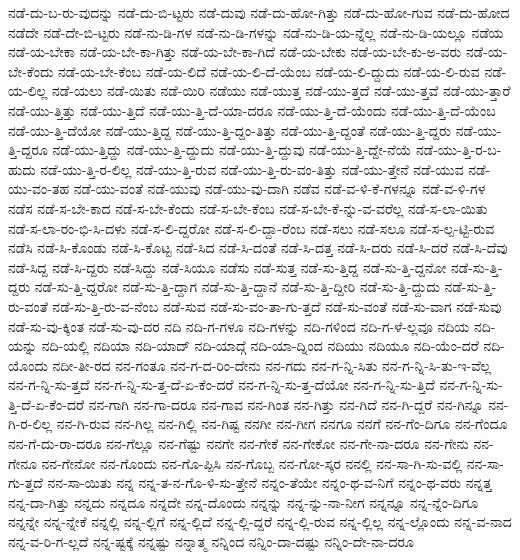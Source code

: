 {ನಡೆ-ದು-ಬ-ರು-ವುದನ್ನು
ನಡೆ-ದು-ಬಿ-ಟ್ಟರು
ನಡೆ-ದುವು
ನಡೆ-ದು-ಹೋ-ಗಿತ್ತು
ನಡೆ-ದು-ಹೋ-ಗುವ
ನಡೆ-ದು-ಹೋದ
ನಡೆದೇ
ನಡೆ-ದೇ-ಬಿ-ಟ್ಟರು
ನಡೆ-ನು-ಡಿ-ಗಳ
ನಡೆ-ನು-ಡಿ-ಗಳನ್ನು
ನಡೆ-ನು-ಡಿ-ಯ-ನ್ನೆಲ್ಲ
ನಡೆ-ನು-ಡಿ-ಯಲ್ಲೂ
ನಡೆಯ
ನಡೆ-ಯ-ಬೇಕಾ
ನಡೆ-ಯ-ಬೇ-ಕಾ-ಗಿತ್ತು
ನಡೆ-ಯ-ಬೇ-ಕಾ-ಗಿದೆ
ನಡೆ-ಯ-ಬೇಕು
ನಡೆ-ಯ-ಬೇ-ಕು-ಅ-ವರು
ನಡೆ-ಯ-ಬೇ-ಕೆಂದು
ನಡೆ-ಯ-ಬೇ-ಕೆಂಬ
ನಡೆ-ಯ-ಲಿದೆ
ನಡೆ-ಯ-ಲಿ-ದೆ-ಯೆಂಬ
ನಡೆ-ಯ-ಲಿ-ದ್ದುದು
ನಡೆ-ಯ-ಲಿ-ರುವ
ನಡೆ-ಯ-ಲಿಲ್ಲ
ನಡೆ-ಯಲು
ನಡೆ-ಯಿತು
ನಡೆ-ಯಿರಿ
ನಡೆಯು
ನಡೆ-ಯುತ್ತ
ನಡೆ-ಯು-ತ್ತದೆ
ನಡೆ-ಯು-ತ್ತವೆ
ನಡೆ-ಯು-ತ್ತಾರೆ
ನಡೆ-ಯು-ತ್ತಿತ್ತು
ನಡೆ-ಯು-ತ್ತಿದೆ
ನಡೆ-ಯು-ತ್ತಿ-ದೆ-ಯಾ-ದರೂ
ನಡೆ-ಯು-ತ್ತಿ-ದೆ-ಯೆಂದು
ನಡೆ-ಯು-ತ್ತಿ-ದೆ-ಯೆಂಬ
ನಡೆ-ಯು-ತ್ತಿ-ದೆಯೋ
ನಡೆ-ಯು-ತ್ತಿದ್ದ
ನಡೆ-ಯು-ತ್ತಿ-ದ್ದಂ-ತಿತ್ತು
ನಡೆ-ಯು-ತ್ತಿ-ದ್ದಂತೆ
ನಡೆ-ಯು-ತ್ತಿ-ದ್ದರು
ನಡೆ-ಯು-ತ್ತಿ-ದ್ದರೂ
ನಡೆ-ಯು-ತ್ತಿದ್ದು
ನಡೆ-ಯು-ತ್ತಿ-ದ್ದುದು
ನಡೆ-ಯು-ತ್ತಿ-ದ್ದುವು
ನಡೆ-ಯು-ತ್ತಿ-ದ್ದೇ-ನೆಯೆ
ನಡೆ-ಯು-ತ್ತಿ-ರ-ಬ-ಹುದು
ನಡೆ-ಯು-ತ್ತಿ-ರ-ಲಿಲ್ಲ
ನಡೆ-ಯು-ತ್ತಿ-ರುವ
ನಡೆ-ಯು-ತ್ತಿ-ರು-ವಂ-ತಿತ್ತು
ನಡೆ-ಯು-ತ್ತೇನೆ
ನಡೆ-ಯುವ
ನಡೆ-ಯು-ವಂ-ತಹ
ನಡೆ-ಯು-ವಂತೆ
ನಡೆ-ಯುವು
ನಡೆ-ಯು-ವು-ದಾಗಿ
ನಡೆವ
ನಡೆ-ವ-ಳಿ-ಕೆ-ಗಳನ್ನೂ
ನಡೆ-ವ-ಳಿ-ಗಳ
ನಡೆಸ
ನಡೆ-ಸ-ಬೇ-ಕಾದ
ನಡೆ-ಸ-ಬೇ-ಕೆಂದು
ನಡೆ-ಸ-ಬೇ-ಕೆಂಬ
ನಡೆ-ಸ-ಬೇ-ಕೆ-ನ್ನು-ವ-ವರೆಲ್ಲ
ನಡೆ-ಸ-ಲಾ-ಯಿತು
ನಡೆ-ಸ-ಲಾ-ರಂ-ಭಿ-ಸಿ-ದಳು
ನಡೆ-ಸ-ಲಿ-ದ್ದರೋ
ನಡೆ-ಸ-ಲಿ-ದ್ದಾ-ರೆಂಬ
ನಡೆ-ಸಲು
ನಡೆ-ಸಲೂ
ನಡೆ-ಸ-ಲ್ಪ-ಟ್ಟಿ-ರುವ
ನಡೆಸಿ
ನಡೆ-ಸಿ-ಕೊಂಡು
ನಡೆ-ಸಿ-ಕೊಟ್ಟ
ನಡೆ-ಸಿದ
ನಡೆ-ಸಿ-ದಂತೆ
ನಡೆ-ಸಿ-ದತ್ತ
ನಡೆ-ಸಿ-ದರು
ನಡೆ-ಸಿ-ದರೆ
ನಡೆ-ಸಿ-ದೆವು
ನಡೆ-ಸಿದ್ದ
ನಡೆ-ಸಿ-ದ್ದರು
ನಡೆ-ಸಿದ್ದು
ನಡೆ-ಸಿಯೂ
ನಡೆಸು
ನಡೆ-ಸುತ್ತ
ನಡೆ-ಸು-ತ್ತಿದ್ದ
ನಡೆ-ಸು-ತ್ತಿ-ದ್ದನೋ
ನಡೆ-ಸು-ತ್ತಿ-ದ್ದರು
ನಡೆ-ಸು-ತ್ತಿ-ದ್ದರೋ
ನಡೆ-ಸು-ತ್ತಿ-ದ್ದಾಗ
ನಡೆ-ಸು-ತ್ತಿ-ದ್ದಾನೆ
ನಡೆ-ಸು-ತ್ತಿ-ದ್ದೀರಿ
ನಡೆ-ಸು-ತ್ತಿ-ದ್ದುದು
ನಡೆ-ಸು-ತ್ತಿ-ರು-ವಂತೆ
ನಡೆ-ಸು-ತ್ತಿ-ರು-ವ-ನೆಂಬ
ನಡೆ-ಸುವ
ನಡೆ-ಸು-ವಂ-ತಾ-ಗು-ತ್ತದೆ
ನಡೆ-ಸು-ವಂತೆ
ನಡೆ-ಸು-ವಾಗ
ನಡೆ-ಸುವು
ನಡೆ-ಸು-ವು-ಕ್ಕಿಂತ
ನಡೆ-ಸು-ವು-ದರ
ನದಿ
ನದಿ-ಗ-ಗಳೂ
ನದಿ-ಗಳನ್ನು
ನದಿ-ಗಳಿಂದ
ನದಿ-ಗ-ಳೆ-ಲ್ಲವೂ
ನದಿಯ
ನದಿ-ಯನ್ನು
ನದಿ-ಯಲ್ಲಿ
ನದಿಯಾ
ನದಿ-ಯಾದ್
ನದಿ-ಯಾದ್ಗೆ
ನದಿ-ಯಾ-ದ್ನಿಂದ
ನದಿಯು
ನದಿಯೂ
ನದಿ-ಯೆಂ-ದರೆ
ನದಿ-ಯೊಂದು
ನದೀ-ತೀ-ರದ
ನನ-ಗಂತೂ
ನನ-ಗ-ದ-ರಿಂ-ದೇನು
ನನ-ಗದು
ನನ-ಗ-ನ್ನಿ-ಸಿತು
ನನ-ಗ-ನ್ನಿ-ಸಿ-ತು-ಇ-ವೆಲ್ಲ
ನನ-ಗ-ನ್ನಿ-ಸು-ತ್ತದೆ
ನನ-ಗ-ನ್ನಿ-ಸು-ತ್ತ-ದೆ-ಏ-ಕೆಂ-ದರೆ
ನನ-ಗ-ನ್ನಿ-ಸು-ತ್ತ-ದೆಯೋ
ನನ-ಗ-ನ್ನಿ-ಸು-ತ್ತಿದೆ
ನನ-ಗ-ನ್ನಿ-ಸು-ತ್ತಿ-ದೆ-ಏ-ಕೆಂ-ದರೆ
ನನ-ಗಾಗಿ
ನನ-ಗಾ-ದರೂ
ನನ-ಗಾವ
ನನ-ಗಿಂತ
ನನ-ಗಿತ್ತು
ನನ-ಗಿದೆ
ನನ-ಗಿ-ದ್ದರೆ
ನನ-ಗಿನ್ನೂ
ನನ-ಗಿ-ರ-ಲಿಲ್ಲ
ನನ-ಗಿ-ರುವ
ನನ-ಗಿಲ್ಲ
ನನ-ಗಿಲ್ಲಿ
ನನ-ಗಿಷ್ಟ
ನನಗೀ
ನನ-ಗೀಗ
ನನಗೂ
ನನಗೆ
ನನ-ಗೆಂ-ದಿಗೂ
ನನ-ಗೆಂದೂ
ನನ-ಗೆ-ದು-ರಾ-ದರೂ
ನನ-ಗೆಲ್ಲೂ
ನನ-ಗೆಷ್ಟು
ನನಗೇ
ನನ-ಗೇಕೆ
ನನ-ಗೇಕೋ
ನನ-ಗೇ-ನಾ-ದರೂ
ನನ-ಗೇನು
ನನ-ಗೇನೂ
ನನ-ಗೇನೋ
ನನ-ಗೊಂದು
ನನ-ಗೊ-ಪ್ಪಿಸಿ
ನನ-ಗೊಬ್ಬ
ನನ-ಗೋ-ಸ್ಕರ
ನನಲ್ಲಿ
ನನ-ಸಾ-ಗಿ-ಸು-ವಲ್ಲಿ
ನನ-ಸಾ-ಗು-ತ್ತದೆ
ನನ-ಸಾ-ಯಿತು
ನನ್ನ
ನನ್ನ-ತ-ನ-ಗೊ-ಳಿ-ಸು-ತ್ತೇನೆ
ನನ್ನಂ-ತೆಯೇ
ನನ್ನಂ-ಥ-ವ-ನಿಗೆ
ನನ್ನಂ-ಥ-ವರು
ನನ್ನತ್ತ
ನನ್ನ-ದಾ-ಗಿತ್ತು
ನನ್ನದು
ನನ್ನದೂ
ನನ್ನದೇ
ನನ್ನ-ದೊಂದು
ನನ್ನನ್ನು
ನನ್ನ-ನ್ನು-ನಾ-ನೀಗ
ನನ್ನನ್ನೂ
ನನ್ನ-ನ್ನೆಂ-ದಿಗೂ
ನನ್ನನ್ನೇ
ನನ್ನ-ನ್ನೇಕೆ
ನನ್ನಲ್ಲಿ
ನನ್ನ-ಲ್ಲಿಗೆ
ನನ್ನ-ಲ್ಲಿದೆ
ನನ್ನ-ಲ್ಲಿ-ದ್ದರೆ
ನನ್ನ-ಲ್ಲಿ-ರುವ
ನನ್ನ-ಲ್ಲಿಲ್ಲ
ನನ್ನ-ಲ್ಲೊಂದು
ನನ್ನ-ವ-ನಾದ
ನನ್ನ-ವ-ರಿ-ಗ-ಲ್ಲದೆ
ನನ್ನ-ಷ್ಟಕ್ಕೆ
ನನ್ನಷ್ಟು
ನನ್ನಾತ್ಮ
ನನ್ನಿಂದ
ನನ್ನಿಂ-ದಾ-ದಷ್ಟು
ನನ್ನಿಂ-ದೇ-ನಾ-ದರೂ
}

